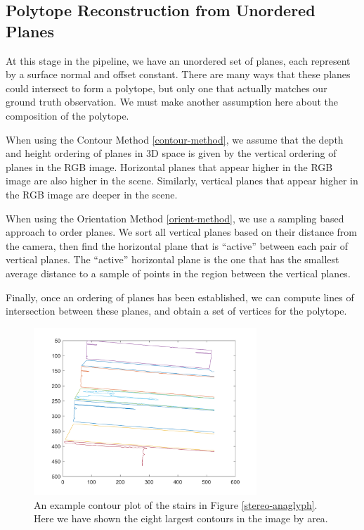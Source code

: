 \subsection{Polytope Reconstruction from Unordered Planes}

At this stage in the pipeline, we have an unordered set of planes, each represent by a surface normal and offset constant. There are many ways that these planes could intersect to form a polytope, but only one that actually matches our ground truth observation. We must make another assumption here about the composition of the polytope.

When using the Contour Method \ref{contour-method}, we assume that the depth and height ordering of planes in 3D space is given by the vertical ordering of planes in the RGB image. Horizontal planes that appear higher in the RGB image are also higher in the scene. Similarly, vertical planes that appear higher in the RGB image are deeper in the scene.

When using the Orientation Method \ref{orient-method}, we use a sampling based approach to order planes. We sort all vertical planes based on their distance from the camera, then find the horizontal plane that is ``active'' between each pair of vertical planes. The ``active'' horizontal plane is the one that has the smallest average distance to a sample of points in the region between the vertical planes.

Finally, once an ordering of planes has been established, we can compute lines of intersection between these planes, and obtain a set of vertices for the polytope.

\begin{figure}[!h]
\centering
\includegraphics[width=3.3in]{Sections/Figures/good_contour_plot_12-7.png}
\caption{An example contour plot of the stairs in Figure \ref{stereo-anaglyph}. Here we have shown the eight largest contours in the image by area.}
\label{contours-example}
\end{figure}

